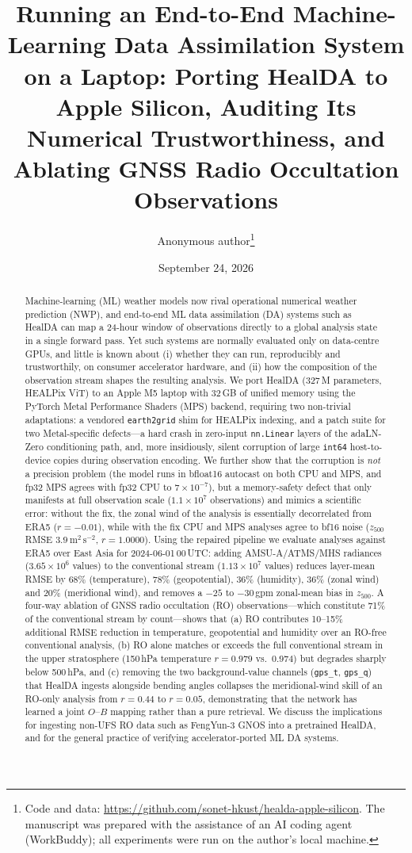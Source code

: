 \documentclass[twocolumn,11pt]{article}
\title{\bfseries Running an End-to-End Machine-Learning Data Assimilation
System on a Laptop: Porting HealDA to Apple Silicon, Auditing Its
Numerical Trustworthiness, and Ablating GNSS Radio Occultation
Observations}
\author{Anonymous author\thanks{%
Code and data: \url{https://github.com/sonet-hkust/healda-apple-silicon}.
The manuscript was prepared with the assistance of an AI coding agent
(WorkBuddy); all experiments were run on the author's local machine.}}
\date{September 24, 2026}
\begin{document}
\maketitle

\begin{abstract}
Machine-learning (ML) weather models now rival operational numerical
weather prediction (NWP), and end-to-end ML data assimilation (DA)
systems such as HealDA
\citep{gupta2026healda} can map a 24-hour window of observations
directly to a global analysis state in a single forward pass. Yet such
systems are normally evaluated only on data-centre GPUs, and little is
known about (i) whether they can run, reproducibly and trustworthily, on
consumer accelerator hardware, and (ii) how the composition of the
observation stream shapes the resulting analysis. We port HealDA
(327\,M parameters, HEALPix ViT) to an Apple M5 laptop with 32\,GB of
unified memory using the PyTorch Metal Performance Shaders (MPS)
backend, requiring two non-trivial adaptations: a vendored
\texttt{earth2grid} shim for HEALPix indexing, and a patch suite for two
Metal-specific defects---a hard crash in zero-input
\texttt{nn.Linear} layers of the adaLN-Zero conditioning path, and,
more insidiously, silent corruption of large \texttt{int64}
host-to-device copies during observation encoding. We further show that
the corruption is \emph{not} a precision problem (the model runs in
bfloat16 autocast on both CPU and MPS, and fp32 MPS agrees with fp32 CPU
to $7\times10^{-7}$), but a memory-safety defect that only manifests at
full observation scale ($1.1\times10^{7}$ observations) and mimics a
scientific error: without the fix, the zonal wind of the analysis is
essentially decorrelated from ERA5 ($r=-0.01$), while with the fix CPU
and MPS analyses agree to bf16 noise ($z_{500}$ RMSE
$3.9\ \mathrm{m^2\,s^{-2}}$, $r=1.0000$). Using the repaired pipeline
we evaluate analyses against ERA5 over East Asia for
2024-06-01\,00\,UTC: adding AMSU-A/ATMS/MHS radiances
($3.65\times10^{6}$ values) to the conventional stream
($1.13\times10^{7}$ values) reduces layer-mean RMSE by 68\% (temperature),
78\% (geopotential), 36\% (humidity), 36\% (zonal wind) and 20\%
(meridional wind), and removes a $-25$ to $-30$\,gpm zonal-mean bias in
$z_{500}$. A four-way ablation of GNSS radio occultation (RO)
observations---which constitute 71\% of the conventional stream by
count---shows that (a) RO contributes 10--15\% additional RMSE
reduction in temperature, geopotential and humidity over an
RO-free conventional analysis, (b) RO alone matches or exceeds the
full conventional stream in the upper stratosphere (150\,hPa
temperature $r=0.979$ vs.\ $0.974$) but degrades sharply below
500\,hPa, and (c) removing the two background-value channels
(\texttt{gps\_t}, \texttt{gps\_q}) that HealDA ingests alongside
bending angles collapses the meridional-wind skill of an RO-only
analysis from $r=0.44$ to $r=0.05$, demonstrating that the network has
learned a joint $O$--$B$ mapping rather than a pure retrieval. We
discuss the implications for ingesting non-UFS RO data such as
FengYun-3 GNOS into a pretrained HealDA, and for the general practice
of verifying accelerator-ported ML DA systems.
\end{abstract}
\end{document}
